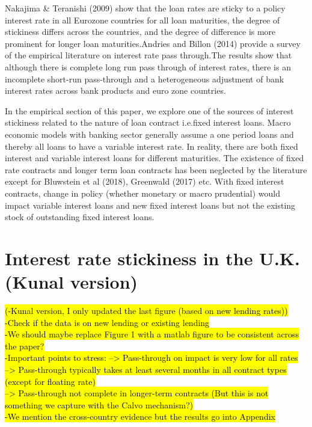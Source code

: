 \documentclass[12pt]{article}
\numberwithin{equation}{section}
\begin{document}
Nakajima \& Teranishi (2009) show that the loan rates are sticky to a policy interest rate in all Eurozone countries for all loan maturities, the degree of stickiness differs across the countries, and the degree of difference is more prominent for longer loan maturities.Andries and Billon (2014) provide a survey of the empirical literature on interest rate pass through.The results show that although there is complete long run pass through of interest rates, there is an incomplete short-run pass-through and a heterogeneous adjustment of bank interest rates across bank products and euro zone countries.

In the empirical section of this paper, we explore one of the sources of interest stickiness related to the nature of loan contract i.e.fixed interest loans. Macro economic models with banking sector generally assume a one period loans and thereby all loans to have a variable interest rate. In reality, there are both fixed interest and variable interest loans for different maturities. The existence of fixed rate contracts and longer term loan contracts has been neglected by the literature except for Bluwstein et al (2018), Greenwald (2017) etc. With fixed interest contracts, change in policy (whether monetary or macro prudential) would impact variable interest loans and new fixed interest loans but not the existing stock of outstanding  fixed interest loans.








\section{Interest rate stickiness in the U.K. (Kunal version) }
\hl{
(-Kunal version, I only updated the last figure (based on new lending rates))\\
-Check if the data is on new lending or existing lending\\
-We should maybe replace Figure 1 with a matlab figure to be consistent across the paper? \\
-Important points to stress:
--> Pass-through on impact is very low for all rates\\
--> Pass-through typically takes at least several months in all contract types (except for floating rate) \\
--> Pass-through not complete in longer-term contracts (But this is not something we capture with the Calvo mechanism?) \\
-We mention the cross-country evidence but the results go into Appendix }
\end{document}

